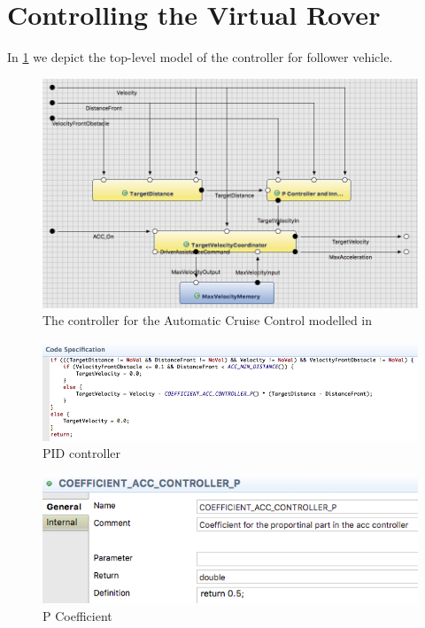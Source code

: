 \section{Controlling the Virtual Rover}

In \fig\ref{fig:acc_model} we depict the top-level model of the controller for
follower vehicle.

\begin{figure}[!h]
\centering
\includegraphics[width=1\textwidth]{images/ACC_controller_model.png}
\caption{The controller for the Automatic Cruise Control modelled in \af}
\label{fig:acc_model}
\end{figure}

\begin{figure}[!h]
\centering
\includegraphics[width=1\textwidth]{images/code_spec_P_controller.png}
\caption{PID controller \af}
\label{fig:pid_controller}
\end{figure}

\begin{figure}[!h]
\centering
\includegraphics[width=.7\textwidth]{images/P_coefficient_controller.png}
\caption{P Coefficient}
\label{fig:p_coefficient}
\end{figure}